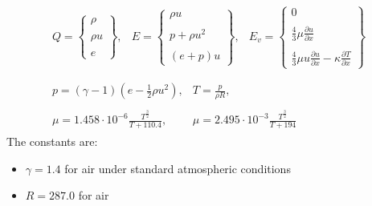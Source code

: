 \documentclass[11pt, a4paper]{article}
\begin{document}
\begin{equation}
    \begin{array}{c}
        \begin{matrix}
            Q=\begin{Bmatrix}
                \rho \\\\
                \rho u \\\\
                e
            \end{Bmatrix}, & E=\begin{Bmatrix}
                \rho u \\\\
                p+\rho u^2 \\\\
                \left(e+p\right)u
            \end{Bmatrix}, & E_v=\begin{Bmatrix}
                0 \\\\
                \displaystyle\frac{4}{3}\mu\frac{\partial u}{\partial x} \\\\
                \displaystyle\frac{4}{3}\mu u\frac{\partial u}{\partial x}-\kappa\frac{\partial T}{\partial x}
            \end{Bmatrix}
        \end{matrix} \\\\
        \begin{matrix}
            \displaystyle p=\left(\gamma-1\right)\left(e-\frac{1}{2}\rho u^2\right), & \displaystyle T=\frac{p}{\rho R}, \\\\
            \displaystyle\mu=1.458\cdot10^{-6}\frac{T^{\frac{3}{2}}}{T+110.4}, & \displaystyle\mu=2.495\cdot10^{-3}\frac{T^{\frac{3}{2}}}{T+194}
        \end{matrix}
    \end{array}
\end{equation}
The constants are:
\begin{itemize}
    \item $\gamma=1.4$ for air under standard atmospheric conditions
    \item $R=287.0$ for air
\end{itemize}
\end{document}
